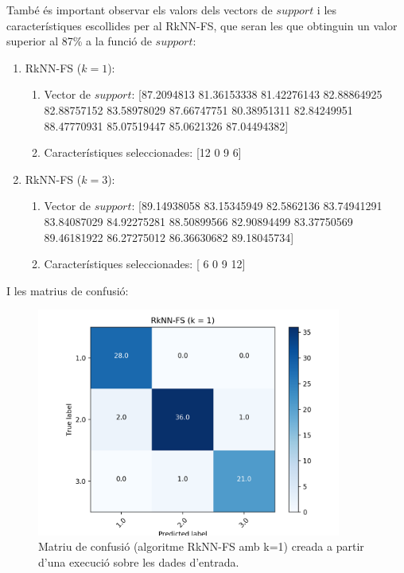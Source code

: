\documentclass{article} %
\begin{document}
{	També és important observar els valors dels vectors de $support$ i les característiques escollides per al RkNN-FS, que seran les que obtinguin un valor superior al 87\% a la funció de $support$:
	\begin{enumerate}
		\item {
			RkNN-FS ($k=1$):
			\begin{enumerate}
				\item Vector de $support$: {\selectfont\small [87.2094813  81.36153338 81.42276143 82.88864925 82.88757152 83.58978029 87.66747751 80.38951311 82.84249951 88.47770931 85.07519447 85.0621326 87.04494382]}
 				\item Característiques seleccionades: {\selectfont\small [12  0  9  6]}
			\end{enumerate}
		}
		\item {
			RkNN-FS ($k=3$):
			\begin{enumerate}
				\item Vector de $support$: {\selectfont\small [89.14938058 83.15345949 82.5862136  83.74941291 83.84087029 84.92275281 88.50899566 82.90894499 83.37750569 89.46181922 86.27275012 86.36630682 89.18045734]}
 				\item Característiques seleccionades: {\selectfont\small [ 6  0  9 12]}
			\end{enumerate}
		}
	\end{enumerate}

	I les matrius de confusió:

	\begin{figure}[H]
		\includegraphics[width=10cm]{r1nn_fs}
		\centering
		\color{blue}
		\caption{Matriu de confusió (algoritme RkNN-FS amb k=1) creada a partir d'una execució sobre les dades d'entrada.}\label{visina8}
	\end{figure}

}
\end{document}

